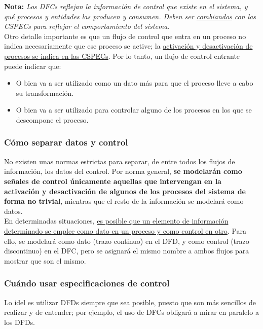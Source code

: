 \textbf{Nota:} \textit{Los DFCs reflejan la información de control que existe en el sistema, y qué procesos y entidades las producen y consumen. Deben ser \uline{combiandos} con las CSPECs para reflejar el comportamiento del sistema.}\\

Otro detalle importante es que un flujo de control que entra en un proceso no indica necesariamente que ese proceso se active; la \uline{activación y desactivación de procesos se indica en las CSPECs}. Por lo tanto, un flujo de control entrante puede indicar que:

\begin{itemize}
    \item O bien va a ser utilizado como un dato más para que el proceso lleve a cabo su transformación.
    \item O bien va a ser utilizado para controlar alguno de los procesos en los que se descompone el proceso.
\end{itemize}

\subsubsection{Cómo separar datos y control}

No existen unas normas estrictas para separar, de entre todos los flujos de información, los datos del control. Por norma general, \textbf{se modelarán como señales de control únicamente aquellas que intervengan en la activación y desactivación de algunos de los procesos del sistema de forma no trivial}, mientras que el resto de la información se modelará como datos.\\

En determinadas situaciones, \uline{es posible que un elemento de información determinado se emplee como dato en un proceso y como control en otro}. Para ello, se modelará como dato (trazo continuo) en el DFD, y como control (trazo discontinuo) en el DFC, pero se asignará el mismo nombre a ambos flujos para mostrar que son el mismo.

\subsubsection{Cuándo usar especificaciones de control}

Lo idel es utilizar DFDs siempre que sea posible, puesto que son más sencillos de realizar y de entender; por ejemplo, el uso de DFCs obligará a mirar en paralelo a los DFDs.\\

